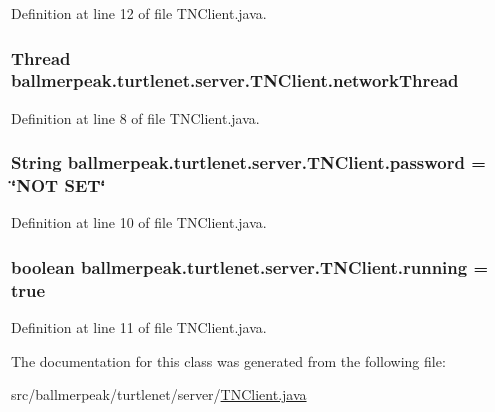 Definition at line 12 of file T\-N\-Client.\-java.

\hypertarget{classballmerpeak_1_1turtlenet_1_1server_1_1TNClient_a30362e2dd295df5ecaadc7fed3374ea0}{
\subsubsection[{network\-Thread}]{\setlength{\rightskip}{0pt plus 5cm}Thread ballmerpeak.\-turtlenet.\-server.\-T\-N\-Client.\-network\-Thread}}\label{classballmerpeak_1_1turtlenet_1_1server_1_1TNClient_a30362e2dd295df5ecaadc7fed3374ea0}


Definition at line 8 of file T\-N\-Client.\-java.

\hypertarget{classballmerpeak_1_1turtlenet_1_1server_1_1TNClient_a9307f6efc05ddda37f9355b6f13953d9}{
\subsubsection[{password}]{\setlength{\rightskip}{0pt plus 5cm}String ballmerpeak.\-turtlenet.\-server.\-T\-N\-Client.\-password = \char`\"{}N\-O\-T S\-E\-T\char`\"{}}}\label{classballmerpeak_1_1turtlenet_1_1server_1_1TNClient_a9307f6efc05ddda37f9355b6f13953d9}


Definition at line 10 of file T\-N\-Client.\-java.

\hypertarget{classballmerpeak_1_1turtlenet_1_1server_1_1TNClient_af8bbdf5ff58fedc8c99ef82b17654a94}{
\subsubsection[{running}]{\setlength{\rightskip}{0pt plus 5cm}boolean ballmerpeak.\-turtlenet.\-server.\-T\-N\-Client.\-running = true}}\label{classballmerpeak_1_1turtlenet_1_1server_1_1TNClient_af8bbdf5ff58fedc8c99ef82b17654a94}


Definition at line 11 of file T\-N\-Client.\-java.



The documentation for this class was generated from the following file\-:\begin{DoxyCompactItemize}
\item 
src/ballmerpeak/turtlenet/server/\hyperlink{TNClient_8java}{T\-N\-Client.\-java}\end{DoxyCompactItemize}
